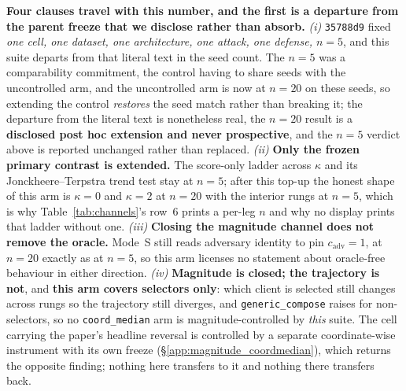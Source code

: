 \documentclass{article}
\begin{document}
\textbf{Four clauses travel with this number, and the first is a departure from the parent freeze that we disclose rather than absorb.} \emph{(i)} \texttt{35788d9} fixed \emph{one cell, one dataset, one architecture, one attack, one defense, $n{=}5$}, and this suite departs from that literal text in the seed count. The $n{=}5$ was a comparability commitment, the control having to share seeds with the uncontrolled arm, and the uncontrolled arm is now at $n{=}20$ on these seeds, so extending the control \emph{restores} the seed match rather than breaking it; the departure from the literal text is nonetheless real, the $n{=}20$ result is a \textbf{disclosed post hoc extension and never prospective}, and the $n{=}5$ verdict above is reported unchanged rather than replaced. \emph{(ii)} \textbf{Only the frozen primary contrast is extended.} The score-only ladder across $\kappa$ and its Jonckheere--Terpstra trend test stay at $n{=}5$; after this top-up the honest shape of this arm is $\kappa{=}0$ and $\kappa{=}2$ at $n{=}20$ with the interior rungs at $n{=}5$, which is why Table~\ref{tab:channels}'s row~6 prints a per-leg $n$ and why no display prints that ladder without one. \emph{(iii)} \textbf{Closing the magnitude channel does not remove the oracle.} Mode~S still reads adversary identity to pin $c_{\mathrm{adv}}{=}1$, at $n{=}20$ exactly as at $n{=}5$, so this arm licenses no statement about oracle-free behaviour in either direction. \emph{(iv)} \textbf{Magnitude is closed; the trajectory is not}, and \textbf{this arm covers selectors only}: which client is selected still changes across rungs so the trajectory still diverges, and \texttt{generic\_compose} raises for non-selectors, so no \texttt{coord\_median} arm is magnitude-controlled by \emph{this} suite. The cell carrying the paper's headline reversal is controlled by a separate coordinate-wise instrument with its own freeze (§\ref{app:magnitude_coordmedian}), which returns the opposite finding; nothing here transfers to it and nothing there transfers back.
\end{document}
